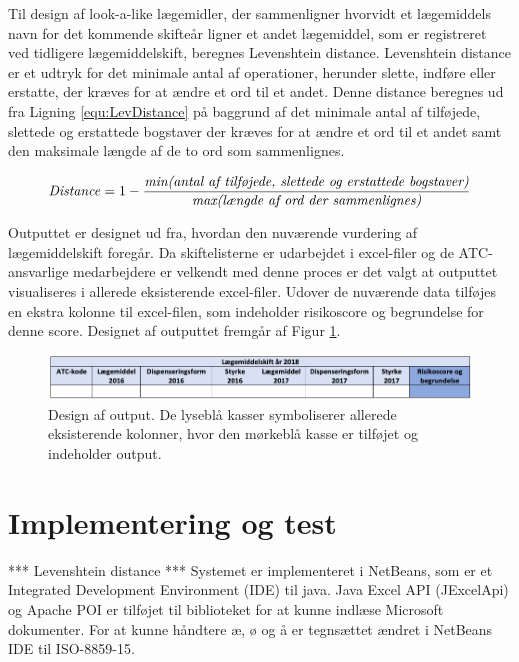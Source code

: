 Til design af look-a-like lægemidler, der sammenligner hvorvidt et lægemiddels navn for det kommende skifteår ligner et andet lægemiddel, som er registreret ved tidligere lægemiddelskift, beregnes Levenshtein distance. Levenshtein distance er et udtryk for det minimale antal af operationer, herunder slette, indføre eller erstatte, der kræves for at ændre et ord til et andet. Denne distance beregnes ud fra Ligning \ref{equ:LevDistance} på baggrund af det minimale antal af tilføjede, slettede og erstattede bogstaver der kræves for at ændre et ord til et andet samt den maksimale længde af de to ord som sammenlignes. 

\begin{equation} \label{equ:LevDistance}
\mbox{\textit{Distance}} = 1 - \frac{\mbox{\textit{min(antal af tilføjede, slettede og erstattede bogstaver)}}}{\mbox{\textit{max(længde af ord der sammenlignes)}}}   
\end{equation}

Outputtet er designet ud fra, hvordan den nuværende vurdering af lægemiddelskift foregår. Da skiftelisterne er udarbejdet i excel-filer og de ATC-ansvarlige medarbejdere er velkendt med denne proces er det valgt at outputtet visualiseres i allerede eksisterende excel-filer. Udover de nuværende data tilføjes en ekstra kolonne til excel-filen, som indeholder risikoscore og begrundelse for denne score. Designet af outputtet fremgår af Figur \ref{fig:Output}.

\begin{figure}[H]\centering
\includegraphics[width=1\textwidth]{billeder/Output.png} 
	\caption{Design af output. De lyseblå kasser symboliserer allerede eksisterende kolonner, hvor den mørkeblå kasse er tilføjet og indeholder output.}
	\label{fig:Output}  
\end{figure}

\newpage
\section{Implementering og test}
*** Levenshtein distance  ***
Systemet er implementeret i NetBeans, som er et Integrated Development Environment (IDE) til java.  Java Excel API (JExcelApi) og Apache POI er tilføjet til biblioteket for at kunne indlæse Microsoft dokumenter. For at kunne håndtere æ, ø og å er tegnsættet ændret i NetBeans IDE til ISO-8859-15. 

